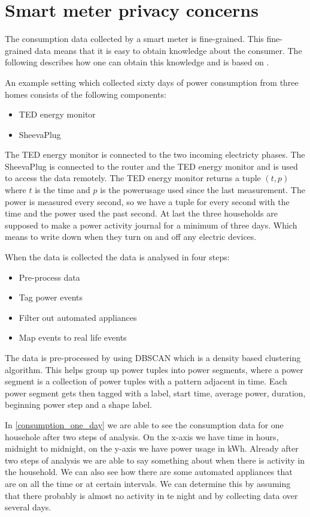 \section{Smart meter privacy concerns}
The consumption data collected by a smart meter is fine-grained.
This fine-grained data means that it is easy to obtain knowledge about the consumer.
The following describes how one can obtain this knowledge and is based on \citet{privacy_memoir}.


An example setting which collected sixty days of power consumption from three homes consists of the following components:
\begin{itemize}
\item TED energy monitor
\item SheevaPlug
\end{itemize}
The TED energy monitor is connected to the two incoming electricty phases.
The SheevaPlug is connected to the router and the TED energy monitor and is used to access the data remotely.
The TED energy monitor returns a tuple $(t,p)$ where $t$ is the time and $p$ is the powerusage used since the last measurement.
The power is measured every second, so we have a tuple for every second with the time and the power used the past second.
At last the three households are supposed to make a power activity journal for a minimum of three days.
Which means to write down when they turn on and off any electric devices.

When the data is collected the data is analysed in four steps:
\begin{itemize}
\item Pre-process data
\item Tag power events
\item Filter out automated appliances
\item Map events to real life events
\end{itemize}

The data is pre-processed by using DBSCAN which is a density based clustering algorithm.
This helps group up power tuples into power segments, where a power segment is a collection of power tuples with a pattern adjacent in time.
Each power segment gets then tagged with a label, start time, average power, duration, beginning power step and a shape label.


In \cref{consumption_one_day} we are able to see the consumption data for one househole after two steps of analysis.
On the x-axis we have time in hours, midnight to midnight, on the y-axis we have power usage in kWh.
Already after two steps of analysis we are able to say something about when there is activity in the household.
We can also see how there are some automated appliances that are on all the time or at certain intervals.
We can determine this by assuming that there probably is almost no activity in te night and by collecting data over several days.



